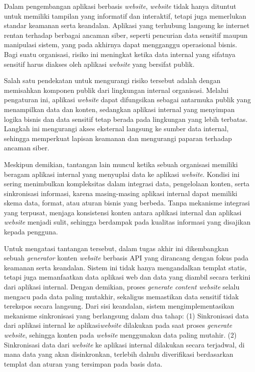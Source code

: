 Dalam pengembangan aplikasi berbasis \textit{website}, \textit{website} tidak hanya dituntut untuk memiliki tampilan yang informatif dan interaktif, tetapi juga memerlukan standar keamanan serta keandalan. Aplikasi yang terhubung langsung ke internet rentan terhadap berbagai ancaman siber, seperti pencurian data sensitif maupun manipulasi sistem, yang pada akhirnya dapat mengganggu operasional bisnis. Bagi suatu organisasi, risiko ini meningkat ketika data internal yang sifatnya sensitif harus diakses oleh aplikasi \textit{website} yang bersifat publik.

Salah satu pendekatan untuk mengurangi risiko tersebut adalah dengan memisahkan komponen publik dari lingkungan internal organisasi. Melalui pengaturan ini, aplikasi \textit{website} dapat difungsikan sebagai antarmuka publik yang menampilkan data dan konten, sedangkan aplikasi internal yang menyimpan logika bisnis dan data sensitif tetap berada pada lingkungan yang lebih terbatas. Langkah ini mengurangi akses eksternal langsung ke sumber data internal, sehingga memperkuat lapisan keamanan dan mengurangi paparan terhadap ancaman siber.

Meskipun demikian, tantangan lain muncul ketika sebuah organisasi memiliki beragam aplikasi internal yang menyuplai data ke aplikasi \textit{website}. Kondisi ini sering menimbulkan kompleksitas dalam integrasi data, pengelolaan konten, serta sinkronisasi informasi, karena masing-masing aplikasi internal dapat memiliki skema data, format, atau aturan bisnis yang berbeda. Tanpa mekanisme integrasi yang terpusat, menjaga konsistensi konten antara aplikasi internal dan aplikasi \textit{website} menjadi sulit, sehingga berdampak pada kualitas informasi yang disajikan kepada pengguna.

Untuk mengatasi tantangan tersebut, dalam tugas akhir ini dikembangkan sebuah \textit{generator} konten \textit{website} berbasis API yang dirancang dengan fokus pada keamanan serta keandalan. Sistem ini tidak hanya mengandalkan templat statis, tetapi juga memanfaatkan data aplikasi web dan data yang diambil secara terkini dari aplikasi internal. Dengan demikian, proses \textit{generate content website} selalu mengacu pada data paling mutakhir, sekaligus memastikan data sensitif tidak terekspos secara langsung. Dari sisi keandalan, sistem mengimplementasikan mekanisme sinkronisasi yang berlangsung dalam dua tahap:  
(1) Sinkronisasi data dari aplikasi internal ke aplikasi\textit{website} dilakukan pada saat proses \textit{generate website}, sehingga konten pada \textit{website} menggunakan data paling mutahir.
(2) Sinkronisasi data dari \textit{website} ke aplikasi internal dilakukan secara terjadwal, di mana data yang akan disinkronkan, terlebih dahulu diverifikasi berdasarkan templat dan aturan yang tersimpan pada basis data.

